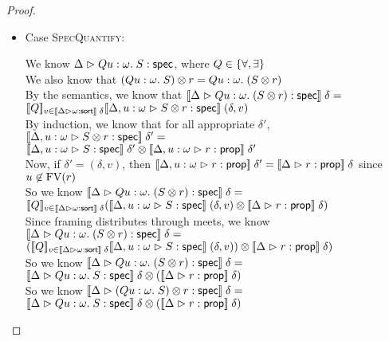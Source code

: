 \begin{proof}
\begin{itemize}
    \item Case \textsc{SpecQuantify}:
      \begin{tabbedproof}
        \oo We know $\judgeS{Q u:\omega.\; S}$, where $Q \in \setof{\forall, \exists}$ \\
        \oo We also know that $\Frame{(Q u:\omega.\; S)}{r} = Q u:\omega.\; (\Frame{S}{r})$ \\
        \oo By the semantics, we know that $\interp{\judgeS{Q u:\omega.\; (\Frame{S}{r)}}}\;\delta = $ \\
        \oox $\interp{Q}_{v \in \interp{\judgeSort{\omega}}\;\delta} \interp{\judgeS[\Delta, u:\omega]{\Frame{S}{r}}}\;(\delta, v)$\\
        \oo By induction, we know that for all appropriate $\delta'$, 
               $\interp{\judgeS[\Delta, u:\omega]{\Frame{S}{r}}}\;\delta' = $ \\
        \oox $\Frame{\interp{\judgeS[\Delta, u:\omega]{S}}\;\delta'}{\interp{\judgeA[\Delta, u:\omega]{r}{\assert}}\;\delta'}$ \\
        \oo Now, if $\delta' = (\delta, v)$, then $\interp{\judgeA[\Delta, u:\omega]{r}{\assert}}\;\delta' = 
                                                   \interp{\judgeA{r}{\assert}}\;\delta$ since $u \not\in \FV{r}$ \\
        \oo So we know $\interp{\judgeS{Q u:\omega.\; (\Frame{S}{r)}}}\;\delta = $ \\
        \oox $\interp{Q}_{v \in \interp{\judgeSort{\omega}}\;\delta} (\Frame{\interp{\judgeS[\Delta, u:\omega]{S}}\;(\delta,v)}{\interp{\judgeA{r}{\assert}}\;\delta})$ \\
        \oo Since framing distributes through meets, we know $\interp{\judgeS{Q u:\omega.\; (\Frame{S}{r)}}}\;\delta = $ \\
        \oox $\Frame{(\interp{Q}_{v \in \interp{\judgeSort{\omega}}\;\delta} \interp{\judgeS[\Delta, u:\omega]{S}}\;(\delta,v))}{\interp{\judgeA{r}{\assert}}\;\delta})$ \\
        \oo So we know $\interp{\judgeS{Q u:\omega.\; (\Frame{S}{r)}}}\;\delta = $ \\
        \oox $\Frame{\interp{\judgeS{Q u:\omega.\;S}}\;\delta}{(\interp{\judgeA{r}{\assert}}\;\delta)}$ \\
        \oo So we know $\interp{\judgeS{\Frame{(Q u:\omega.\; S)}{r}}}\;\delta = $ \\
        \oox $\Frame{\interp{\judgeS{Q u:\omega.\;S}}\;\delta}{(\interp{\judgeA{r}{\assert}}\;\delta)}$ \\
        
      \end{tabbedproof}
  \end{itemize}
\end{proof}


